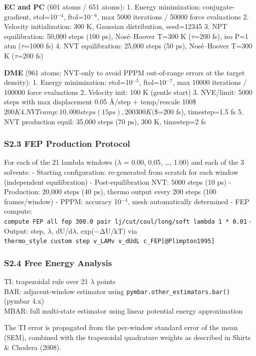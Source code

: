 \documentclass[
  11pt,
]{article}
\begin{document}
\textbf{EC and PC} (601 atoms / 651 atoms): 1. Energy minimization:
conjugate-gradient, etol=10\(^{-4}\), ftol=10\(^{-6}\), max 5000
iterations / 50000 force evaluations 2. Velocity initialization: 300 K,
Gaussian distribution, seed=12345 3. NPT equilibration: 50,000 steps
(100 ps), Nosé--Hoover T=300 K (\(\tau\)=200 fs), iso P=1 atm
(\(\tau\)=1000 fs) 4. NVT equilibration: 25,000 steps (50 ps),
Nosé--Hoover T=300 K (\(\tau\)=200 fs)

\textbf{DME} (961 atoms; NVT-only to avoid PPPM out-of-range errors at
the target density): 1. Energy minimization: etol=10\(^{-5}\),
ftol=10\(^{-7}\), max 10000 iterations / 100000 force evaluations 2.
Velocity init: 100 K (gentle start) 3. NVE/limit: 5000 steps with max
displacement 0.05 \AA{}/step + temp/rescale 100\$\rightarrow\(200 K
4. NVT ramp: 10,000 steps (15 ps), 200\)\rightarrow\(300 K (\)\tau\$=200
fs), timestep=1.5 fs 5. NVT production equil: 35,000 steps (70 ps), 300
K, timestep=2 fs

\subsubsection{S2.3 FEP Production
Protocol}\label{s2.3-fep-production-protocol}

For each of the 21 lambda windows (\(\lambda\) = 0.00, 0.05, \ldots,
1.00) and each of the 3 solvents: - Starting configuration: re-generated
from scratch for each window (independent equilibration) -
Post-equilibration NVT: 5000 steps (10 ps) - Production: 20,000 steps
(40 ps), thermo output every 200 steps (100 frames/window) - PPPM:
accuracy 10\(^{-4}\), mesh automatically determined - FEP compute:
\texttt{compute\ FEP\ all\ fep\ 300.0\ pair\ lj/cut/coul/long/soft\ lambda\ 1\ *\ 0.01}
- Output: step, \(\lambda\), dU/d\(\lambda\), exp(−ΔU/kT) via
\texttt{thermo\_style\ custom\ step\ v\_LAMv\ v\_dUdL\ c\_FEP{[}@Plimpton1995{]}}

\subsubsection{S2.4 Free Energy
Analysis}\label{s2.4-free-energy-analysis}

TI: trapezoidal rule over 21 \(\lambda\) points\\
BAR: adjacent-window estimator using
\texttt{pymbar.other\_estimators.bar()} (pymbar 4.x)\\
MBAR: full multi-state estimator using linear potential energy
approximation

The TI error is propagated from the per-window standard error of the
mean (SEM), combined with the trapezoidal quadrature weights as
described in Shirts \& Chodera (2008).
\end{document}
